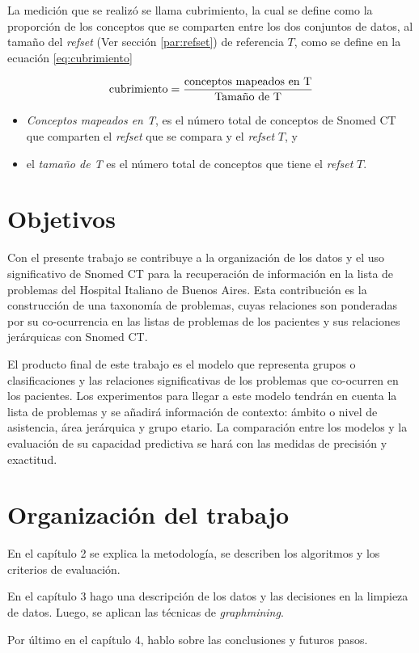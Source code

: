 La medición que se realizó se llama cubrimiento, la cual se define como la proporción de los conceptos que se comparten entre los dos conjuntos de datos, al tamaño del \textit{\acrshort{refset}} (Ver sección \ref{par:refset}) de referencia $T$, como se define en la ecuación \ref{eq:cubrimiento}

\begin{equation}\label{eq:cubrimiento}
\textup{cubrimiento} = \frac{\textup{conceptos mapeados en T}}{\textup{Tamaño de T}}
\end{equation}

\begin{itemize}
\item \textit{Conceptos mapeados en T}, es el número total de conceptos de Snomed CT que comparten el \textit{refset} que se compara y el \textit{refset} $T$, y
\item el \textit{tamaño de T} es el número total de conceptos que tiene el \textit{refset} $T$.
\end{itemize}

\section{Objetivos}
Con el presente trabajo se contribuye a la organización de los datos y el uso significativo de Snomed CT para la recuperación de información en la lista de problemas del Hospital Italiano de Buenos Aires. Esta contribución es la construcción de una taxonomía de problemas, cuyas relaciones son ponderadas por su co-ocurrencia en las listas de problemas de los pacientes y sus relaciones jerárquicas con Snomed CT.

El producto final de este trabajo es el modelo que representa grupos o clasificaciones y las relaciones significativas de los problemas que co-ocurren en los pacientes. Los experimentos para llegar a este modelo tendrán en cuenta la lista de problemas y se añadirá  información de contexto: ámbito o nivel de asistencia, área jerárquica y grupo etario. La comparación entre los modelos y la evaluación de su capacidad predictiva se hará con las medidas de precisión y exactitud. 

\section{Organización del trabajo}
% 
% 
En el capítulo 2 se explica la metodología, se describen los algoritmos y los criterios de evaluación.

En el capítulo 3 hago una descripción de los datos y las decisiones en la limpieza de datos. Luego, se aplican las técnicas de \textit{graphmining}.
 
Por último en el capítulo 4, hablo sobre las conclusiones y futuros pasos.
